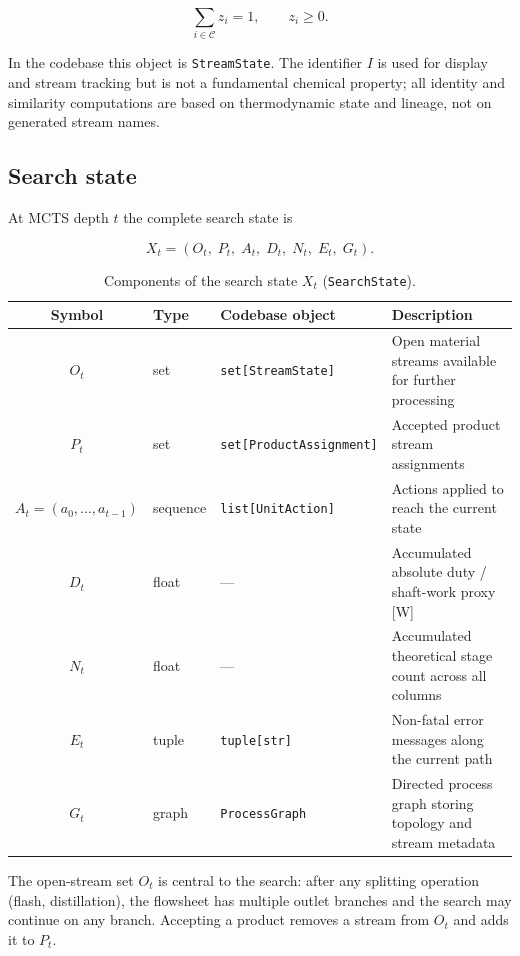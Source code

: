 \documentclass[11pt,a4paper]{article}
\theoremstyle{definition}
\theoremstyle{plain}
\newcommand{\StreamState}{\texttt{StreamState}}
\newcommand{\SearchState}{\texttt{SearchState}}
\newcommand{\ProcessGraph}{\texttt{ProcessGraph}}
\newcommand{\calC}{\mathcal{C}}
\begin{document}
\begin{equation}
 \sum_{i \in \calC} z_i = 1, \qquad z_i \geq 0.
\end{equation}

In the codebase this object is \StreamState{}. The identifier $I$ is used for display and stream tracking but is not a fundamental chemical property; all identity and similarity computations are based on thermodynamic state and lineage, not on generated stream names.

\subsection{Search state}

At MCTS depth $t$ the complete search state is

\begin{equation}
 X_t = (O_t,\; P_t,\; A_t,\; D_t,\; N_t,\; E_t,\; G_t).
\end{equation}

\begin{table}[ht]
\centering
\caption{Components of the search state $X_t$ (\SearchState{}).}
\label{tab:search_state}
\begin{tabularx}{\linewidth}{@{}cll X@{}}
\toprule
Symbol & Type & Codebase object & Description \\
\midrule
$O_t$ & set & \texttt{set[StreamState]} &
 Open material streams available for further processing \\
$P_t$ & set & \texttt{set[ProductAssignment]} &
 Accepted product stream assignments \\
$A_t = (a_0,\ldots,a_{t-1})$ & sequence & \texttt{list[UnitAction]} &
 Actions applied to reach the current state \\
$D_t$ & float & --- &
 Accumulated absolute duty / shaft-work proxy [W] \\
$N_t$ & float & --- &
 Accumulated theoretical stage count across all columns \\
$E_t$ & tuple & \texttt{tuple[str]} &
 Non-fatal error messages along the current path \\
$G_t$ & graph & \ProcessGraph{} &
 Directed process graph storing topology and stream metadata \\
\bottomrule
\end{tabularx}
\end{table}

The open-stream set $O_t$ is central to the search: after any splitting operation (flash, distillation), the flowsheet has multiple outlet branches and the search may continue on any branch. Accepting a product removes a stream from $O_t$ and adds it to $P_t$.
\end{document}
